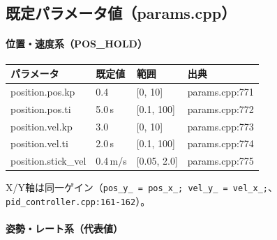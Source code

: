 \documentclass[a4paper,10pt]{ltjsarticle}
\begin{document}
\subsection{既定パラメータ値（params.cpp）}

\paragraph{位置・速度系（POS\_HOLD）}

\begin{table}[h]
\centering\footnotesize
\begin{tabularx}{\textwidth}{@{}lllY@{}}
\toprule
パラメータ & 既定値 & 範囲 & 出典 \\
\midrule
position.pos.kp & 0.4 & [0, 10] & params.cpp:771 \\
position.pos.ti & 5.0\,s & [0.1, 100] & params.cpp:772 \\
position.vel.kp & 3.0 & [0, 10] & params.cpp:773 \\
position.vel.ti & 2.0\,s & [0.1, 100] & params.cpp:774 \\
position.stick\_vel & 0.4\,m/s & [0.05, 2.0] & params.cpp:775 \\
\bottomrule
\end{tabularx}
\end{table}

X/Y軸は同一ゲイン（\texttt{pos\_y\_ = pos\_x\_; vel\_y\_ = vel\_x\_;}、\texttt{pid\_controller.cpp:161-162}）。

\paragraph{姿勢・レート系（代表値）}
\end{document}
